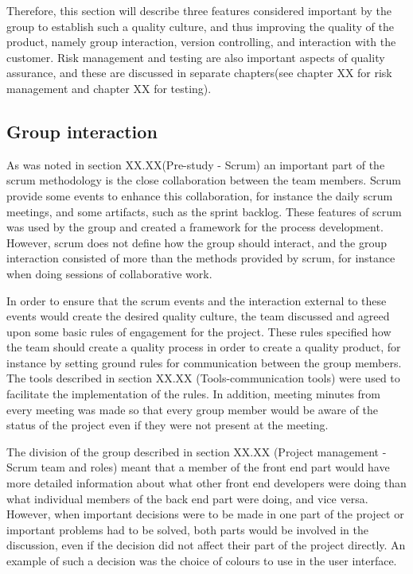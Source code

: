 Therefore, this section will describe three features considered important by the group to establish such a quality culture, and thus improving the quality of the product, namely group interaction, version controlling, and interaction with the customer. Risk management and testing are also important aspects of quality assurance, and these are discussed in separate chapters(see chapter XX for risk management and chapter XX for testing). 

\subsection{Group interaction}

As was noted in section XX.XX(Pre-study - Scrum) an important part of the scrum methodology is the close collaboration between the team members. Scrum provide some events to enhance this collaboration, for instance the daily scrum meetings, and some artifacts, such as the sprint backlog. These features of scrum was used by the group and created a framework for the process development. However, scrum does not define how the group should interact, and the group interaction consisted of more than the methods provided by scrum, for instance when doing sessions of collaborative work.\newline

In order to ensure that the scrum events and the interaction external to these events would create the desired quality culture, the team discussed and agreed upon some basic rules of engagement for the project. These rules specified how the team should create a quality process in order to create a quality product, for instance by setting ground rules for communication between the group members. The tools described in section XX.XX (Tools-communication tools) were used to facilitate the implementation of the rules. In addition, meeting minutes from every meeting was made so that every group member would be aware of the status of the project even if they were not present at the meeting.\newline

The division of the group described in section XX.XX (Project management - Scrum team and roles) meant that a member of the front end part would have more detailed information about what other front end developers were doing than what individual members of the back end part were doing, and vice versa. However, when important decisions were to be made in one part of the project or important problems had to be solved, both parts would be involved in the discussion, even if the decision did not affect their part of the project directly. An example of such a decision was the choice of colours to use in the user interface.

